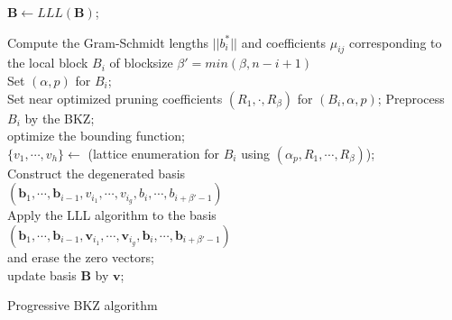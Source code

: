 \begin{algorithm}[h!]
$\pmb{B} \leftarrow LLL(\pmb{B})$; \\
{
    {
        {

          Compute the Gram-Schmidt lengths $||b^{*}_i||$ and coefficients $\mu_{ij}$ corresponding to the local block $B_i$ of blocksize $\beta'= min(\beta, n-i+1)$\\
          Set $(\alpha, p)$ for $B_i$; \\
          Set near optimized pruning coefficients $(R_1,\cdot, R_{\beta})$ for $(B_i,\alpha, p)$;
          Preprocess $B_i$ by the BKZ; \\
            {
                optimize the bounding function;\\
            }
          $\{v_1, \cdots , v_h\} \leftarrow$ (lattice enumeration for $B_i$ using $(\alpha_p, R_1, \cdots , R_{\beta})$); \\
          Construct the degenerated basis \\
            $(\pmb{b}_1, \cdots , \pmb{b}_{i-1}, v_{i_1}, \cdots , v_{i_g}, b_i, \cdots , b_{i+\beta'-1})$\\
          Apply the LLL algorithm to the basis \\
            $(\pmb{b}_1, \cdots , \pmb{b}_{i-1}, \pmb{v}_{i_1}, \cdots , \pmb{v}_{i_g}, \pmb{b}_i, \cdots , \pmb{b}_{i+\beta'-1})$ \\
          and erase the zero vectors;\\
            {
                 update basis $\pmb{B}$ by $\pmb{v}$;
            }
        }
    }
}
\caption{Progressive BKZ algorithm}
\label{alg:Prog_BKZ_algo}
\end{algorithm}












